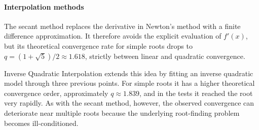 \paragraph{Interpolation methods}
The secant method replaces the derivative in Newton's method with a finite
difference approximation. It therefore avoids the explicit evaluation of
$f'(x)$, but its theoretical convergence rate for simple roots drops to
$q = (1+\sqrt{5})/2 \approx 1.618$, strictly between linear and quadratic
convergence.

Inverse Quadratic Interpolation extends this idea by fitting an inverse
quadratic model through three previous points. For simple roots it has a higher
theoretical convergence order, approximately $q \approx 1.839$, and in the tests
it reached the root very rapidly. As with the secant method, however, the
observed convergence can deteriorate near multiple roots because the underlying
root-finding problem becomes ill-conditioned.
